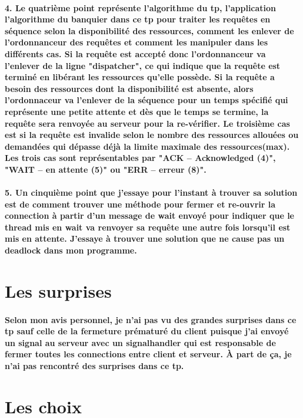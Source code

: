 \documentclass{article}
\begin{document}
\paragraph{4. Le quatrième point représente l'algorithme du tp, l'application l'algorithme du banquier dans ce tp pour traiter les requêtes en séquence selon la disponibilité des ressources, comment les enlever de l'ordonnanceur des requêtes et comment les manipuler dans les différents cas. Si la requête est accepté donc l'ordonnanceur va l'enlever de la ligne "dispatcher", ce qui indique que la requête est terminé en libérant les ressources qu'elle possède. Si la requête a besoin des ressources dont la disponibilité est absente, alors l'ordonnaceur va l'enlever de la séquence pour un temps spécifié qui représente une petite attente et dès que le temps se termine, la requête sera renvoyée au serveur pour la re-vérifier. Le troisième cas est si la requête est invalide selon le nombre des ressources allouées ou demandées qui dépasse déjà la limite maximale des ressources(max). Les trois cas sont représentables par "ACK -- Acknowledged (4)", "WAIT -- en attente (5)" ou "ERR -- erreur (8)".}

\paragraph{5. Un cinquième point que j'essaye pour l'instant à trouver sa solution est de comment trouver une méthode pour fermer et re-ouvrir la connection à partir d'un message de wait envoyé pour indiquer que le thread mis en wait va renvoyer sa requête une autre fois lorsqu'il est mis en attente. J'essaye à trouver une solution que ne cause pas un deadlock dans mon programme.}

\section{Les surprises}
\paragraph{Selon mon avis personnel, je n'ai pas vu des grandes surprises dans ce tp sauf celle de la fermeture prématuré du client puisque j'ai envoyé un signal au serveur avec un signalhandler qui est responsable de fermer toutes les connections entre client et serveur. À part de ça, je n'ai pas rencontré des surprises dans ce tp.}


\section{Les choix}
\end{document}
